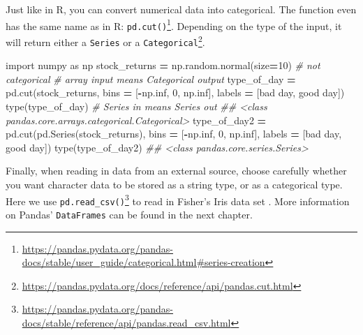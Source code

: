 \documentclass[
  12pt,
  krantz2]{krantz}
\makeatletter
\newenvironment{Shaded}{\begin{snugshade}}{\end{snugshade}}
\newcommand{\BuiltInTok}[1]{#1}
\newcommand{\CommentTok}[1]{\textcolor[rgb]{0.37,0.37,0.37}{\textit{#1}}}
\newcommand{\DecValTok}[1]{\textcolor[rgb]{0.06,0.06,0.06}{#1}}
\newcommand{\ImportTok}[1]{#1}
\newcommand{\NormalTok}[1]{#1}
\newcommand{\OperatorTok}[1]{\textcolor[rgb]{0.43,0.43,0.43}{\textbf{#1}}}
\newcommand{\StringTok}[1]{\textcolor[rgb]{0.5,0.5,0.5}{#1}}
\renewcommand{\href}[2]{#2\footnote{\url{#1}}}
\newenvironment{kframe}{%
\medskip{}
\setlength{\fboxsep}{.8em}
 \def\at@end@of@kframe{}%
 \ifinner\ifhmode%
  \def\at@end@of@kframe{\end{minipage}}%
  \begin{minipage}{\columnwidth}%
 \fi\fi%
 \def\FrameCommand##1{\hskip\@totalleftmargin \hskip-\fboxsep
 \colorbox{shadecolor}{##1}\hskip-\fboxsep
     \hskip-\linewidth \hskip-\@totalleftmargin \hskip\columnwidth}%
 \MakeFramed {\advance\hsize-\width
   \@totalleftmargin\z@ \linewidth\hsize
   \@setminipage}}%
 {\par\unskip\endMakeFramed%
 \at@end@of@kframe}
\renewenvironment{Shaded}{\begin{kframe}}{\end{kframe}}
\makeatother
\begin{document}
Just like in R, you can convert numerical data into categorical. The function even has the same name as in R: \href{https://pandas.pydata.org/pandas-docs/stable/user_guide/categorical.html\#series-creation}{\texttt{pd.cut()}}. Depending on the type of the input, \href{https://pandas.pydata.org/docs/reference/api/pandas.cut.html}{it will return either a \texttt{Series} or a \texttt{Categorical}}.

\begin{Shaded}
\begin{Highlighting}[]
\ImportTok{import}\NormalTok{ numpy }\ImportTok{as}\NormalTok{ np}
\NormalTok{stock\_returns }\OperatorTok{=}\NormalTok{ np.random.normal(size}\OperatorTok{=}\DecValTok{10}\NormalTok{) }\CommentTok{\# not categorical }
\CommentTok{\# array input means Categorical output}
\NormalTok{type\_of\_day }\OperatorTok{=}\NormalTok{ pd.cut(stock\_returns, }
\NormalTok{                     bins }\OperatorTok{=}\NormalTok{ [}\OperatorTok{{-}}\NormalTok{np.inf, }\DecValTok{0}\NormalTok{, np.inf], }
\NormalTok{                     labels }\OperatorTok{=}\NormalTok{ [}\StringTok{\textquotesingle{}bad day\textquotesingle{}}\NormalTok{, }\StringTok{\textquotesingle{}good day\textquotesingle{}}\NormalTok{]) }
\BuiltInTok{type}\NormalTok{(type\_of\_day)}
\CommentTok{\# Series in means Series out}
\CommentTok{\#\# \textless{}class \textquotesingle{}pandas.core.arrays.categorical.Categorical\textquotesingle{}\textgreater{}}
\NormalTok{type\_of\_day2 }\OperatorTok{=}\NormalTok{ pd.cut(pd.Series(stock\_returns), }
\NormalTok{                      bins }\OperatorTok{=}\NormalTok{ [}\OperatorTok{{-}}\NormalTok{np.inf, }\DecValTok{0}\NormalTok{, np.inf], }
\NormalTok{                      labels }\OperatorTok{=}\NormalTok{ [}\StringTok{\textquotesingle{}bad day\textquotesingle{}}\NormalTok{, }\StringTok{\textquotesingle{}good day\textquotesingle{}}\NormalTok{]) }
\BuiltInTok{type}\NormalTok{(type\_of\_day2)}
\CommentTok{\#\# \textless{}class \textquotesingle{}pandas.core.series.Series\textquotesingle{}\textgreater{}}
\end{Highlighting}
\end{Shaded}

Finally, when reading in data from an external source, choose carefully whether you want character data to be stored as a string type, or as a categorical type. Here we use \href{https://pandas.pydata.org/pandas-docs/stable/reference/api/pandas.read_csv.html}{\texttt{pd.read\_csv()}} to read in Fisher's Iris data set \citep{misc_iris_53}. More information on Pandas' \texttt{DataFrames} can be found in the next chapter.
\end{document}
